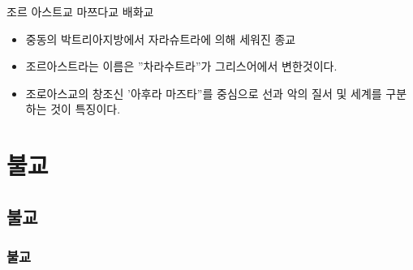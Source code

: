 \documentclass[12pt, a4paper, oneside]{book}
\let\stdsection\section
\renewcommand\section{\newpage\stdsection}
\begin{document}
		조르 아스트교 
		마쯔다교
		배화교
		


 	 	 	\begin{itemize}[											
 	 	 				topsep=		0	em,					
	 					parsep=		0	em,					
						itemsep=		0	em,					
						leftmargin=		6	em,					
						labelwidth= 	3	em,					
						labelsep=		3	em					
						]								
			\item 중동의 박트리아지방에서 자라슈트라에 의해 세워진 종교
			\item 조르아스트라는 이름은 ''차라수트라''가 그리스어에서 변한것이다.
			\item 조로아스교의 창조신 '아후라 마즈타''를 중심으로 선과 악의 질서 및 세계를 구분하는 것이 특징이다.
			\end{itemize}											





	\part{불교}
	\noptcrule
	\parttoc				


	\chapter{불교}

	\section{불교}
\end{document}
